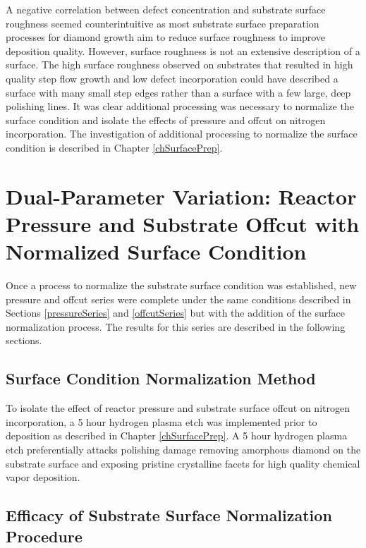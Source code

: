 A negative correlation between defect concentration and substrate surface roughness seemed counterintuitive as most substrate surface preparation processes for diamond growth aim to reduce surface roughness to improve deposition quality. However, surface roughness is not an extensive description of a surface. The high surface roughness observed on substrates that resulted in high quality step flow growth and low defect incorporation could have described a surface with many small step edges rather than a surface with a few large, deep polishing lines. It was clear additional processing was necessary to normalize the surface condition and isolate the effects of pressure and offcut on nitrogen incorporation. The investigation of additional processing to normalize the surface condition is described in Chapter \ref{chSurfacePrep}.

\section{Dual-Parameter Variation: Reactor Pressure and Substrate Offcut with Normalized Surface Condition}
\label{pressureOffcutRedo}
\indent

Once a process to normalize the substrate surface condition was established, new pressure and offcut series were complete under the same conditions described in Sections \ref{pressureSeries} and \ref{offcutSeries} but with the addition of the surface normalization process. The results for this series are described in the following sections.

\subsection{Surface Condition Normalization Method}
\label{surfaceNormProcess}
\indent

To isolate the effect of reactor pressure and substrate surface offcut on nitrogen incorporation, a 5 hour hydrogen plasma etch was implemented prior to deposition as described in Chapter \ref{chSurfacePrep}. A 5 hour hydrogen plasma etch preferentially attacks polishing damage removing amorphous diamond on the substrate surface and exposing pristine crystalline facets for high quality chemical vapor deposition.

\subsection{Efficacy of Substrate Surface Normalization Procedure}
\label{pressureOffcutRedo}
\indent

